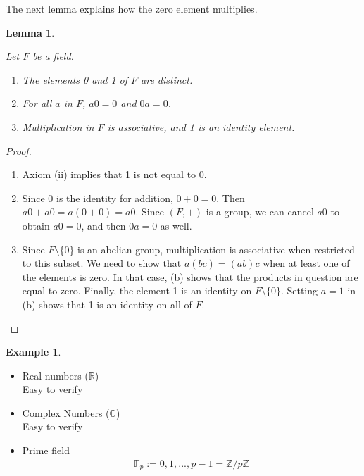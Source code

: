\documentclass[
]{book}
\providecommand{\tightlist}{%
  \setlength{\itemsep}{0pt}\setlength{\parskip}{0pt}}
\newtheorem{lemma}{Lemma}[chapter]
\theoremstyle{definition}
\theoremstyle{definition}
\newtheorem{example}{Example}[chapter]
\theoremstyle{definition}
\theoremstyle{definition}
\theoremstyle{remark}
\begin{document}
The next lemma explains how the zero element multiplies.

\begin{lemma}
\protect\hypertarget{lem:unnamed-chunk-74}{}\label{lem:unnamed-chunk-74}

Let \(F\) be a field.

\begin{enumerate}
\def\labelenumi{(\alph{enumi})}
\item
  The elements 0 and 1 of \(F\) are distinct.
\item
  For all \(a\) in \(F\), \(a0 = 0\) and \(0a = 0\).
\item
  Multiplication in \(F\) is associative, and 1 is an identity element.
\end{enumerate}

\end{lemma}

\begin{proof}
\leavevmode

\begin{enumerate}
\def\labelenumi{(\alph{enumi})}
\item
  Axiom (ii) implies that 1 is not equal to 0.
\item
  Since 0 is the identity for addition, \(0 + 0 = 0\). Then \(a0 + a0 = a(0 + 0)= a0\). Since \((F,+)\) is a group, we can cancel \(a0\) to obtain \(a0 = 0\), and then \(0a = 0\) as well.
\item
  Since \(F \setminus \{0\}\) is an abelian group, multiplication is associative when restricted to this subset. We need to show that \(a(bc) = (ab)c\) when at least one of the elements is zero. In that case, (b) shows that the products in question are equal to zero. Finally, the element 1 is an identity on \(F \setminus \{0\}\). Setting \(a = 1\) in (b) shows that 1 is an identity on all of \(F\).
\end{enumerate}

\end{proof}

\begin{example}
\protect\hypertarget{exm:unnamed-chunk-76}{}\label{exm:unnamed-chunk-76}\leavevmode

\begin{itemize}
\tightlist
\item
  Real numbers (\(\mathbb{R}\))\\
  Easy to verify
\item
  Complex Numbers (\(\mathbb{C}\))\\
  Easy to verify
\item
  Prime field
  \[\mathbb{F}_p:={\overline{0},\overline{1},...,\overline{p-1}}=\mathbb{Z}/p\mathbb{Z}\]
\end{itemize}

\end{example}
\end{document}
